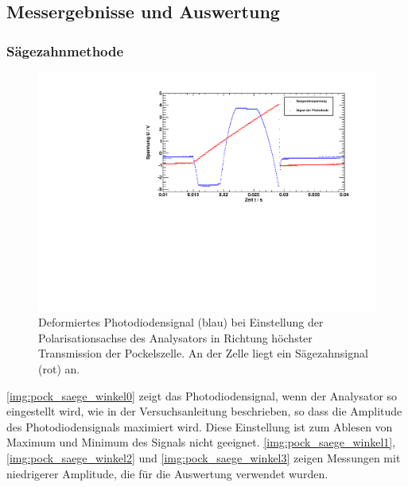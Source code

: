 \subsection{Messergebnisse und Auswertung}

\subsubsection{Sägezahnmethode}

\begin{figure}[H]
\begin{center}
  \includegraphics[width=15cm]{../img/pock_saege_winkel0.pdf}
  \caption{Deformiertes Photodiodensignal (blau) bei Einstellung der Polarisationsachse des Analysators in
  Richtung höchster Transmission der Pockelszelle. An der Zelle liegt ein Sägezahnsignal (rot) an.}
  \label{img:pock_saege_winkel0}
\end{center}
\end{figure}

\autoref{img:pock_saege_winkel0} zeigt das Photodiodensignal, wenn der Analysator so eingestellt wird,
wie in der Versuchsanleitung beschrieben, so dass die Amplitude des Photodiodensignals maximiert wird.
Diese Einstellung ist zum Ablesen von Maximum und Minimum des Signals nicht geeignet.
\autoref{img:pock_saege_winkel1}, \autoref{img:pock_saege_winkel2} und \autoref{img:pock_saege_winkel3}
zeigen Messungen mit niedrigerer Amplitude, die für die Auswertung verwendet wurden.

